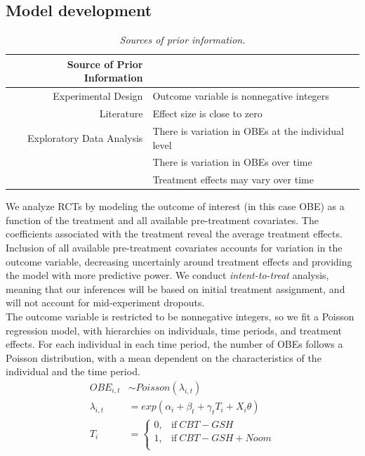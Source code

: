 \documentclass[12pt, oneside]{article}
\begin{document}
\subsection{Model development}

\begin{table}[t]
\centering
\begin{tabular}{r l}
  Source of Prior Information &  \\ 
  \hline  \vspace{0.25em}
  Experimental Design & Outcome variable is nonnegative integers \\
  \vspace{0.25em}
  Literature & Effect size is close to zero \\
  Exploratory Data Analysis & There is variation in OBEs at the individual level \\
					  & There is variation in OBEs over time \\
                                            & Treatment effects may vary over time \\
    \hline
\end{tabular}
\caption{\emph{Sources of prior information.}}
\end{table}

We analyze RCTs by modeling the outcome of interest (in this case OBE) as a function of the treatment and all available pre-treatment covariates.  The coefficients associated with the treatment reveal the average treatment effects.  Inclusion of all available pre-treatment covariates accounts for variation in the outcome variable, decreasing uncertainly around treatment effects and providing the model with more predictive power.  We conduct \emph{intent-to-treat} analysis, meaning that our inferences will be based on initial treatment assignment, and will not account for mid-experiment dropouts.  
\\

The outcome variable is restricted to be nonnegative integers, so we fit a Poisson regression model, with hierarchies on individuals, time periods, and treatment effects.  For each individual in each time period, the number of OBEs follows a Poisson distribution, with a mean dependent on the characteristics of the individual and the time period.  
\begin{align}
OBE_{i,t} &\sim Poisson(\lambda_{i,t}) \\
\lambda_{i,t} &= exp(\alpha_i + \beta_t + \gamma_tT_i + X_i\theta) \\
T_i &=
    \begin{cases}
      0, & \text{if}\ CBT-GSH \\
      1, & \text{if}\ CBT-GSH + Noom \\
    \end{cases}
\end{align}
\end{document}
